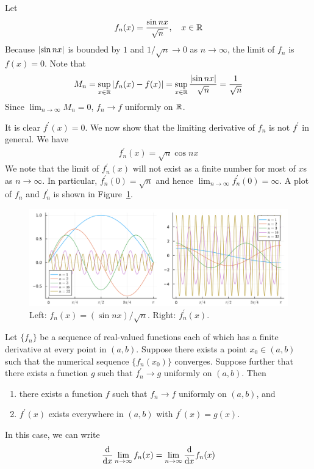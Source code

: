 \documentclass[thmcnt=section, 12pt]{my-elegantbook}
\begin{document}
\begin{example}
    Let
    \begin{align*}
        f_n(x) = \frac{\sin nx}{\sqrt{n}},
        \quad x \in \R
    \end{align*}
    Because $\abs{\sin nx}$ is bounded by $1$ and $1 / \sqrt{n} \to 0$ as $n \to \infty$, the limit of $f_n$ is $f(x) = 0$. Note that
    \begin{align*}
        M_n = \sup_{x \in \R} \abs{f_n(x) - f(x)}
        = \sup_{x \in \R} \frac{\abs{\sin nx}}{\sqrt{n}}
        = \frac{1}{\sqrt{n}}
    \end{align*}
    Since $\lim_{n \to \infty} M_n = 0$, $f_n \to f$ uniformly on $\R$.

    It is clear $f^\prime(x) = 0$. We now show that the limiting derivative of $f_n$ is not $f^\prime$ in general. We have
    \begin{align*}
        f^\prime_n(x) = \sqrt{n} \cos nx
    \end{align*}
    We note that the limit of $f^\prime_n(x)$ will not exist as a finite number for most of $x$s as $n \to \infty$. In particular, $f^\prime_n(0) = \sqrt{n}$ and hence $\lim_{n \to \infty} f^\prime_n(0) = \infty$. A plot of $f_n$ and $f^\prime_n$ is shown in Figure~\ref{fig:11}.

    \begin{figure}[ht]
        \centering
        \includegraphics[scale=0.2]{figures/graph-010.png}
        \caption{Left: $f_n(x) = (\sin nx) / \sqrt{n}$. Right: $f^\prime_n(x)$.}
        \label{fig:11}
    \end{figure}
\end{example}

\begin{theorem} \label{thm:44}
    Let $\{f_n\}$ be a sequence of real-valued functions each of which has a finite derivative at every point in $(a, b)$. Suppose there exists a point $x_0 \in (a, b)$ such that the numerical sequence $\{f_n(x_0)\}$ converges. Suppose further that there exists a function $g$ such that $f^\prime_n \to g$ uniformly on $(a, b)$. Then
    \begin{enumerate}
        \item there exists a function $f$ such that $f_n \to f$ uniformly on $(a, b)$, and
        \item $f^\prime(x)$ exists everywhere in $(a, b)$ with $f^\prime(x) = g(x)$.
    \end{enumerate}
    In this case, we can write
    \begin{align*}
        \odvs{\lim_{n \to \infty} f_n(x)}{x}
        = \lim_{n \to \infty} \odvs{f_n(x)}{x}
    \end{align*}
\end{theorem}
\end{document}
